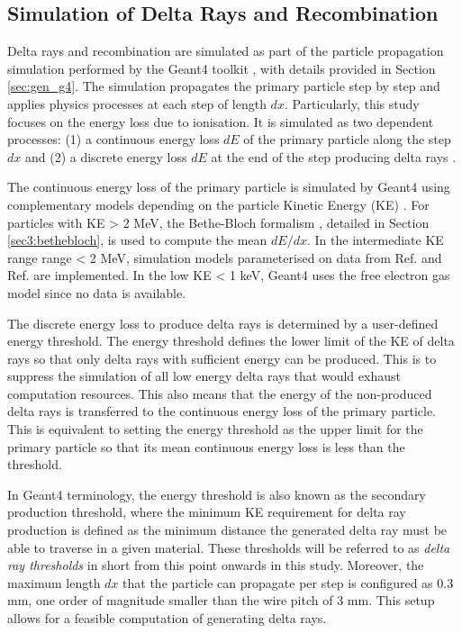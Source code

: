 \subsection{Simulation of Delta Rays and Recombination}
\label{sec:simDeltaRay}

Delta rays and recombination are simulated as part of the particle propagation simulation performed by the Geant4 toolkit \cite{geant4}, with details provided in Section \ref{sec:gen_g4}.
The simulation propagates the primary particle step by step and applies physics processes at each step of length $dx$.
Particularly, this study focuses on the energy loss due to ionisation.
It is simulated as two dependent processes: (1) a continuous energy loss $dE$ of the primary particle along the step $dx$ and (2) a discrete energy loss $dE$ at the end of the step producing delta rays \cite{geant4}.

The continuous energy loss of the primary particle is simulated by Geant4 using complementary models depending on the particle Kinetic Energy (KE) \cite{geant4_ions}.
For particles with KE > 2 MeV, the Bethe-Bloch formalism \cite{Passage}, detailed in Section \ref{sec3:bethebloch}, is used to compute the mean $dE/dx$.
In the intermediate KE range range < 2 MeV, simulation models parameterised on data from Ref. \cite{Ziegler} and Ref. \cite{ICRU} are implemented.
In the low KE < 1 keV, Geant4 uses the free electron gas model since no data is available.

The discrete energy loss to produce delta rays is determined by a user-defined energy threshold.
The energy threshold defines the lower limit of the KE of delta rays so that only delta rays with sufficient energy can be produced.
This is to suppress the simulation of all low energy delta rays that would exhaust computation resources.
This also means that the energy of the non-produced delta rays is transferred to the continuous energy loss of the primary particle.
This is equivalent to setting the energy threshold as the upper limit for the primary particle so that its mean continuous energy loss is less than the threshold.

In Geant4 terminology, the energy threshold is also known as the secondary production threshold, where the minimum KE requirement for delta ray production is defined as the minimum distance the generated delta ray must be able to traverse in a given material. 
These thresholds will be referred to as \textit{delta ray thresholds} in short from this point onwards in this study. 
Moreover, the maximum length $dx$ that the particle can propagate per step is configured as 0.3 mm, one order of magnitude smaller than the wire pitch of 3 mm.
This setup allows for a feasible computation of generating delta rays.

